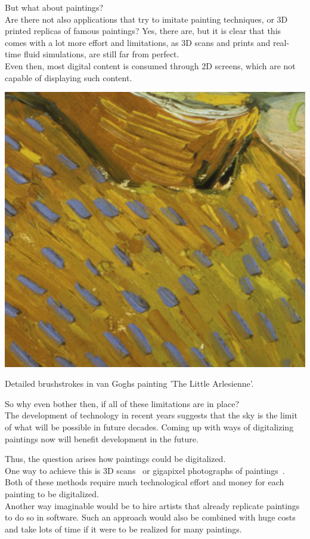 But what about paintings?\\
Are there not also applications that try to imitate painting techniques, or 3D printed replicas of famous paintings?
Yes, there are, but it is clear that this comes with a lot more effort and limitations, as 3D scans and prints and real-time fluid simulations, are still far from perfect.\\
Even then, most digital content is consumed through 2D screens, which are not capable of displaying such content.
\begin{marginfigure}
    \includegraphics{images/cutout_orig}%
    \caption{Detailed brushstrokes in van Goghs painting 'The Little Arlesienne'.}
\end{marginfigure}

So why even bother then, if all of these limitations are in place?\\
The development of technology in recent years suggests that the sky is the limit of what will be possible in future decades.
Coming up with ways of digitalizing paintings now will benefit development in the future.

Thus, the question arises how paintings could be digitalized.\\
One way to achieve this is 3D scans~\cite{3Dscan_art, 3Dscan_thesis} or gigapixel photographs of paintings~\cite{googleartproject}.
Both of these methods require much technological effort and money for each painting to be digitalized.\\
Another way imaginable would be to hire artists that already replicate paintings to do so in software.
Such an approach would also be combined with huge costs and take lots of time if it were to be realized for many paintings.

